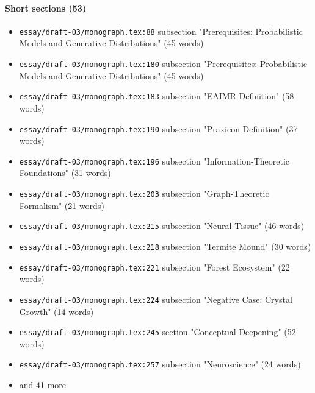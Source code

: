 \documentclass[11pt]{article}
\newcommand{\loc}[1]{{\small\color{muted}\texttt{#1}}}
\begin{document}
\paragraph{Short sections (53)}
\begin{itemize}
\item \loc{essay/\allowbreak{}draft-03/\allowbreak{}monograph.tex:88} subsection "Prerequisites: Probabilistic Models and Generative Distributions" (45 words)
\item \loc{essay/\allowbreak{}draft-03/\allowbreak{}monograph.tex:180} subsection "Prerequisites: Probabilistic Models and Generative Distributions" (45 words)
\item \loc{essay/\allowbreak{}draft-03/\allowbreak{}monograph.tex:183} subsection "EAIMR Definition" (58 words)
\item \loc{essay/\allowbreak{}draft-03/\allowbreak{}monograph.tex:190} subsection "Praxicon Definition" (37 words)
\item \loc{essay/\allowbreak{}draft-03/\allowbreak{}monograph.tex:196} subsection "Information-Theoretic Foundations" (31 words)
\item \loc{essay/\allowbreak{}draft-03/\allowbreak{}monograph.tex:203} subsection "Graph-Theoretic Formalism" (21 words)
\item \loc{essay/\allowbreak{}draft-03/\allowbreak{}monograph.tex:215} subsection "Neural Tissue" (46 words)
\item \loc{essay/\allowbreak{}draft-03/\allowbreak{}monograph.tex:218} subsection "Termite Mound" (30 words)
\item \loc{essay/\allowbreak{}draft-03/\allowbreak{}monograph.tex:221} subsection "Forest Ecosystem" (22 words)
\item \loc{essay/\allowbreak{}draft-03/\allowbreak{}monograph.tex:224} subsection "Negative Case: Crystal Growth" (14 words)
\item \loc{essay/\allowbreak{}draft-03/\allowbreak{}monograph.tex:245} section "Conceptual Deepening" (52 words)
\item \loc{essay/\allowbreak{}draft-03/\allowbreak{}monograph.tex:257} subsection "Neuroscience" (24 words)
\item[] {\color{muted}\small and 41 more}
\end{itemize}
\end{document}

